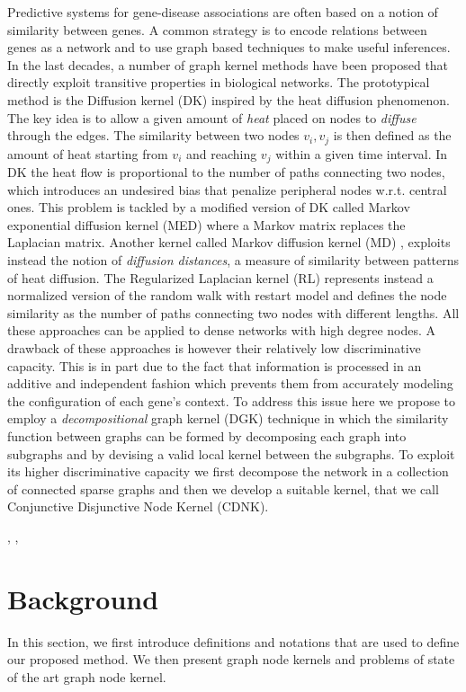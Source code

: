 \documentclass[review]{elsarticle}
\begin{document}
Predictive systems for gene-disease associations are often based on a notion of similarity between genes. A common strategy is to encode relations between genes as a network and to use graph based techniques to make useful inferences. In the last decades, a number of graph kernel methods have been proposed that directly exploit transitive properties in biological networks. The prototypical method is the Diffusion kernel (DK) \cite{kondor2002diffusion} inspired by the heat diffusion phenomenon. The key idea is to allow a given amount of {\em heat} placed on nodes to {\em diffuse} through the edges. The similarity between two nodes $v_{i}, v_{j}$ is then defined as the amount of heat starting from $v_{i}$ and reaching $v_{j}$ within a given time interval. In DK the heat flow is proportional to the number of paths connecting two nodes, which introduces an undesired bias that penalize peripheral nodes w.r.t. central ones. This problem is tackled by a modified version of DK called Markov exponential diffusion kernel (MED) \cite{chen2014disease} where a Markov matrix replaces the Laplacian matrix.  Another kernel called Markov diffusion kernel (MD) \cite{fouss2006experimental}, exploits instead the notion of {\em diffusion distances}, a measure of similarity between patterns of heat diffusion. The Regularized Laplacian kernel (RL) \cite{chebotarev2006matrix} represents instead a normalized version of the random walk with restart model and defines the node similarity as the number of paths connecting two nodes with different lengths. All these approaches can be applied to dense networks with high degree nodes. A drawback of these approaches is however their relatively low discriminative capacity. This is in part due to the fact that information is processed in an additive and independent fashion which prevents them from accurately modeling the configuration of each gene's context. To address this issue here we propose to employ a {\em decompositional} graph kernel (DGK) \cite{haussler1999convolution} technique in which the similarity function between graphs can be formed by decomposing each graph into subgraphs and by devising a valid local kernel between the subgraphs. To exploit its higher discriminative capacity we first decompose the network in a collection of connected sparse graphs and then we develop a suitable kernel, that we call Conjunctive Disjunctive Node Kernel (CDNK).

\cite{mordelet2011prodige}, \cite{chen2014disease}, \cite{valentini2014extensive}
\section{Background}
In this section, we first introduce definitions and notations that are used to define our proposed method. We then present graph node kernels and problems of state of the art graph node kernel.
\end{document}

